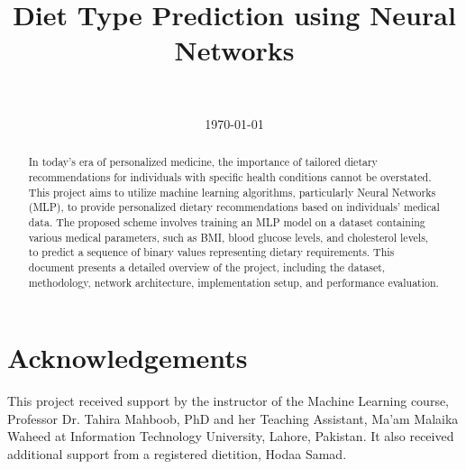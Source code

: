 \documentclass{IEEEtran}
\begin{document}
\title{Diet Type Prediction using Neural Networks}

\author{
    \\
}

\date{\today}

\maketitle

\begin{abstract}
    In today's era of personalized medicine, the importance of tailored dietary recommendations for individuals with specific health conditions cannot be overstated. This project aims to utilize machine learning algorithms, particularly Neural Networks (MLP), to provide personalized dietary recommendations based on individuals' medical data. The proposed scheme involves training an MLP model on a dataset containing various medical parameters, such as BMI, blood glucose levels, and cholesterol levels, to predict a sequence of binary values representing dietary requirements. This document presents a detailed overview of the project, including the dataset, methodology, network architecture, implementation setup, and performance evaluation.
\end{abstract}








\section*{Acknowledgements}
This project received support by the instructor of the Machine Learning course, Professor Dr. Tahira Mahboob, PhD and her Teaching Assistant, Ma'am Malaika Waheed at Information Technology University, Lahore, Pakistan.
It also received additional support from a registered dietition, Hodaa Samad.
\end{document}
